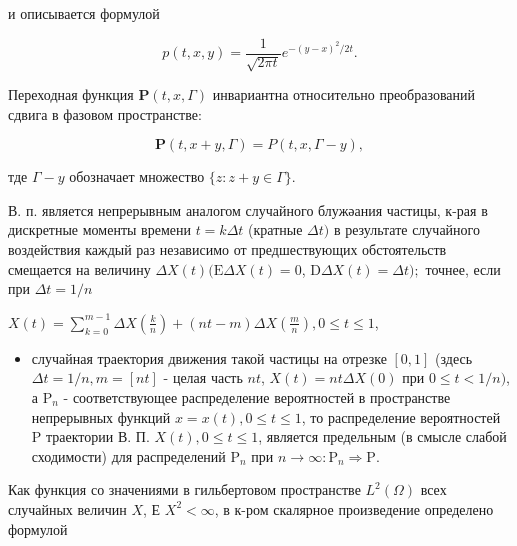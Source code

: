 \documentclass[10pt]{article}
\begin{document}
и описывается формулой



\[

p(t, x, y)=\frac{1}{\sqrt{2 \pi t}} e^{-(y-x)^{2} / 2 t} .

\]



Переходная функция $\boldsymbol{P}(t, x, \Gamma)$ инвариантна относительно преобразований сдвига в фазовом пространстве:



\[

\boldsymbol{P}(t, x+y, \Gamma)=P(t, x, \Gamma-y),

\]



тде $\Gamma-y$ обозначает множество $\{z: z+y \in \Gamma\}$.



В. п. является непрерывным аналогом случайного блужәания частицы, к-рая в дискретные моменты времени $t=k \Delta t$ (кратные $\Delta t)$ в результате случайного воздействия каждый раз независимо от предшествующих обстоятельств смещается на величину $\Delta X(t)(\mathrm{E} \Delta X(t)=0$, $\mathrm{D} \Delta X(t)=\Delta t) ;$ точнее, если при $\Delta t=1 / n$



$X(t)=\sum_{k=0}^{m-1} \Delta X\left(\frac{k}{n}\right)+(n t-m) \Delta X\left(\frac{m}{n}\right), 0 \leqslant t \leqslant 1$,



\begin{itemize}

  \item случайная траектория движения такой частицы на отрезке $[0,1]$ (здесь $\Delta t=1 / n, m=[n t]$ - целая часть $n t$, $X(t)=n t \Delta X(0)$ при $0 \leqslant t<1 / n)$, а $\mathrm{P}_{n}$ - соответствующее распределение вероятностей в пространстве непрерывных функций $x=x(t), 0 \leqslant t \leqslant 1$, то распределение вероятностей $\mathrm{P}$ траектории В. П. $X(t), 0 \leqslant t \leqslant 1$, является предельным (в смысле слабой сходимости) для распределений $\mathrm{P}_{n}$ при $n \rightarrow \infty: \mathrm{P}_{n} \Rightarrow \mathrm{P}$.

\end{itemize}



Как функция со значениями в гильбертовом пространстве $L^{2}(\Omega)$ всех случайных величин $X$, Е $X^{2}<\infty$, в к-ром скалярное произведение определено формулой
\end{document}
